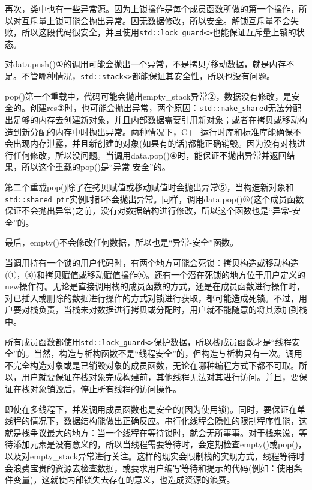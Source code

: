 再次，类中也有一些异常源。因为上锁操作是每个成员函数所做的第一个操作，所以对互斥量上锁可能会抛出异常。因无数据修改，所以安全。解锁互斥量不会失败，所以这段代码很安全，并且使用\texttt{std::lock\_guard<>}也能保证互斥量上锁的状态。

对data.push()①的调用可能会抛出一个异常，不是拷贝/移动数据，就是内存不足。不管哪种情况，\texttt{std::stack<>}都能保证其安全性，所以也没有问题。

pop()第一个重载中，代码可能会抛出empty\_stack异常②，数据没有修改，是安全的。创建res③时，也可能会抛出异常，两个原因：\texttt{std::make\_shared}无法分配出足够的内存去创建新对象，并且内部数据需要引用新对象；或者在拷贝或移动构造到新分配的内存中时抛出异常。两种情况下，C++运行时库和标准库能确保不会出现内存泄露，并且新创建的对象(如果有的话)都能正确销毁。因为没有对栈进行任何修改，所以没问题。当调用data.pop()④时，能保证不抛出异常并返回结果，所以这个重载的pop()是“异常-安全”的。

第二个重载pop()除了在拷贝赋值或移动赋值时会抛出异常⑤，当构造新对象和\texttt{std::shared\_ptr}实例时都不会抛出异常。同样，调用data.pop()⑥(这个成员函数保证不会抛出异常)之前，没有对数据结构进行修改，所以这个函数也是“异常-安全”的。

最后，empty()不会修改任何数据，所以也是“异常-安全”函数。

当调用持有一个锁的用户代码时，有两个地方可能会死锁：拷贝构造或移动构造(①，③)和拷贝赋值或移动赋值操作⑤。还有一个潜在死锁的地方位于用户定义的new操作符。无论是直接调用栈的成员函数的方式，还是在成员函数进行操作时，对已插入或删除的数据进行操作的方式对锁进行获取，都可能造成死锁。不过，用户要对栈负责，当栈未对数据进行拷贝或分配时，用户就不能随意的将其添加到栈中。

所有成员函数都使用\texttt{std::lock\_guard<>}保护数据，所以栈成员函数才是“线程安全”的。当然，构造与析构函数不是“线程安全”的，但构造与析构只有一次。调用不完全构造对象或是已销毁对象的成员函数，无论在哪种编程方式下都不可取。所以，用户就要保证在栈对象完成构建前，其他线程无法对其进行访问。并且，要保证在栈对象销毁后，停止所有线程的访问操作。

即使在多线程下，并发调用成员函数也是安全的(因为使用锁)。同时，要保证在单线程的情况下，数据结构能做出正确反应。串行化线程会隐性的限制程序性能，这就是栈争议最大的地方：当一个线程在等待锁时，就会无所事事。对于栈来说，等待添加元素是没有意义的，所以当线程需要等待时，会定期检查empty()或pop()，以及对empty\_stack异常进行关注。这样的现实会限制栈的实现方式，线程等待时会浪费宝贵的资源去检查数据，或要求用户编写等待和提示的代码(例如：使用条件变量)，这就使内部锁失去存在的意义，也造成资源的浪费。

